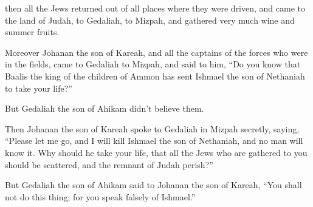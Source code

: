 {then all the Jews returned out of all places where they were driven, and came to the land of Judah, to Gedaliah, to Mizpah, and gathered very much wine and summer fruits.
\par }{\PP {}Moreover Johanan the son of Kareah, and all the captains of the forces who were in the fields, came to Gedaliah to Mizpah,
and said to him, “Do you know that Baalis the king of the children of Ammon has sent Ishmael the son of Nethaniah to take your life?”
\par }{\PP But Gedaliah the son of Ahikam didn’t believe them.
\par }{\PP {}Then Johanan the son of Kareah spoke to Gedaliah in Mizpah secretly, saying, “Please let me go, and I will kill Ishmael the son of Nethaniah, and no man will know it. Why should he take your life, that all the Jews who are gathered to you should be scattered, and the remnant of Judah perish?”
\par }{\PP {}But Gedaliah the son of Ahikam said to Johanan the son of Kareah, “You shall not do this thing; for you speak falsely of Ishmael.”

}
